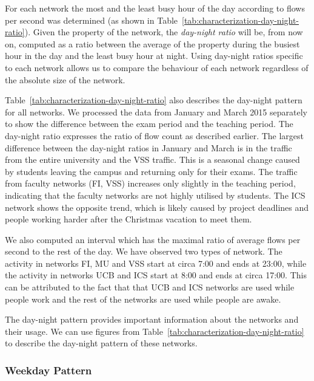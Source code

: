 For each network the most and the least busy hour of the day according to flows per second was determined (as shown in Table~\ref{tab:characterization-day-night-ratio}). Given the property of the network, the \textit{day-night ratio} will be, from now on, computed as a ratio between the average of the property during the busiest hour in the day and the least busy hour at night. Using day-night ratios specific to each network allows us to compare the behaviour of each network regardless of the absolute size of the network. 

Table~\ref{tab:characterization-day-night-ratio} also describes the day-night pattern for all networks. We processed the data from January and March 2015 separately to show the difference between the exam period and the teaching period. The day-night ratio expresses the ratio of flow count as described earlier. The largest difference between the day-night ratios in January and March is in the traffic from the entire university and the VSS traffic. This is a seasonal change caused by students leaving the campus and returning only for their exams. The traffic from faculty networks (FI, VSS) increases only slightly in the teaching period, indicating that the faculty networks are not highly utilised by students. The ICS network shows the opposite trend, which is likely caused by project deadlines and people working harder after the Christmas vacation to meet them.

We also computed an interval which has the maximal ratio of average flows per second to the rest of the day. We have observed two types of network. The activity in networks FI, MU and VSS start at circa 7:00 and ends at 23:00, while the activity in networks UCB and ICS start at 8:00 and ends at circa 17:00. This can be attributed to the fact that that UCB and ICS networks are used while people work and the rest of the networks are used while people are awake.

The day-night pattern provides important information about the networks and their usage. We can use figures from Table~\ref{tab:characterization-day-night-ratio} to describe the day-night pattern of these networks.

\subsubsection{Weekday Pattern}

